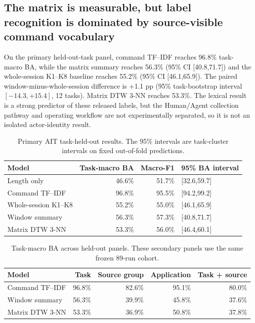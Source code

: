 \documentclass[11pt]{article}
\begin{document}
\subsection{The matrix is measurable, but label recognition is dominated by source-visible command vocabulary}
On the primary held-out-task panel, command TF--IDF reaches 96.8\% task-macro BA, while the matrix summary reaches 56.3\% (95\% CI [40.8,71.7]) and the whole-session K1--K8 baseline reaches 55.2\% (95\% CI [46.1,65.9]). The paired window-minus-whole-session difference is +1.1 pp (95\% task-bootstrap interval $[-14.3,+15.4]$, 12 tasks). Matrix DTW 3-NN reaches 53.3\%. The lexical result is a strong predictor of these released labels, but the Human/Agent collection pathway and operating workflow are not experimentally separated, so it is not an isolated actor-identity result.

\begin{table}[ht]
\centering
\small
\caption{Primary AIT task-held-out results. The 95\% intervals are task-cluster intervals on fixed out-of-fold predictions.}
\begin{tabular}{@{}l r r l@{}}
\toprule
Model & Task-macro BA & Macro-F1 & 95\% BA interval \\
\midrule
Length only & 46.6\% & 51.7\% & [32.6,59.7] \\
Command TF--IDF & 96.8\% & 95.5\% & [94.2,99.2] \\
Whole-session K1--K8 & 55.2\% & 55.0\% & [46.1,65.9] \\
Window summary & 56.3\% & 57.3\% & [40.8,71.7] \\
Matrix DTW 3-NN & 53.3\% & 56.0\% & [46.4,60.1] \\
\bottomrule
\end{tabular}
\end{table}

\begin{table}[ht]
\centering
\small
\caption{Task-macro BA across held-out panels. These secondary panels use the same frozen 89-run cohort.}
\begin{tabular}{@{}l r r r r@{}}
\toprule
Model & Task & Source group & Application & Task + source \\
\midrule
Command TF--IDF & 96.8\% & 82.6\% & 95.1\% & 80.0\% \\
Window summary & 56.3\% & 39.9\% & 45.8\% & 37.6\% \\
Matrix DTW 3-NN & 53.3\% & 36.9\% & 50.8\% & 37.8\% \\
\bottomrule
\end{tabular}
\end{table}
\end{document}
